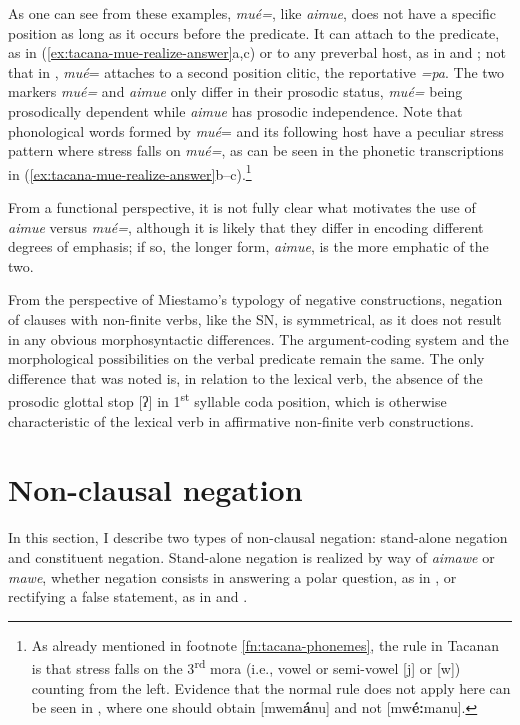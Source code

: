 \documentclass[output=paper]{langsci/langscibook}
\begin{document}
As one can see from these examples, \textit{mué=}, like \textit{aimue},
does not have a specific position as long as it occurs before the
predicate. It can attach to the predicate, as in
(\ref{ex:tacana-mue-realize-answer}a,c) or to any preverbal host, as in
 and ; not that in
, \textit{mué}= attaches to a second position clitic,
the reportative \textit{=pa}. The two markers \textit{mué=} and
\textit{aimue} only differ in their prosodic status, \textit{mué=} being
prosodically dependent while \textit{aimue} has prosodic independence. Note
that phonological words formed by \textit{mué}= and its following host have
a peculiar stress pattern where stress falls on \textit{mué=}, as can be
seen in the phonetic transcriptions in
(\ref{ex:tacana-mue-realize-answer}b--c).\footnote{As already mentioned in footnote \ref{fn:tacana-phonemes}, the rule in Tacanan is that
stress falls on the 3\textsuperscript{rd} mora (i.e., vowel or semi-vowel
[j] or [w]) counting from the left. Evidence that the normal rule does not
apply here can be seen in , where one should obtain [mwem\textbf{á}nu] and not [mw\textbf{é:}manu].} 

From a functional perspective, it is not fully clear what motivates the use
of \textit{aimue} versus \textit{mué=}, although it is likely that they
differ in encoding different degrees of emphasis; if so, the longer form, \textit{aimue}, is the more emphatic of the two.

From the perspective of Miestamo's \parencites*{Miestamo2005}{Miestamo2007}
typology of negative constructions, negation of clauses with non-finite
verbs, like the SN, is symmetrical, as it does not result in any obvious
morphosyntactic differences. The argument-coding system and the
morphological possibilities on the verbal predicate remain the same. The
only difference that was noted is, in relation to the lexical verb, the absence of the prosodic glottal stop [ʔ] in 1\textsuperscript{st} syllable coda position, which is otherwise characteristic of the lexical verb in affirmative non-finite verb constructions.

\section{Non-clausal negation}\label{sec:tacana-7}

In this section, I describe two types of non-clausal negation: stand-alone
negation and constituent negation. Stand-alone negation is
realized by way of \textit{aimawe} or \textit{mawe}, whether negation
consists in answering a polar question, as in
, or rectifying a false statement, as in
 and .
\end{document}
